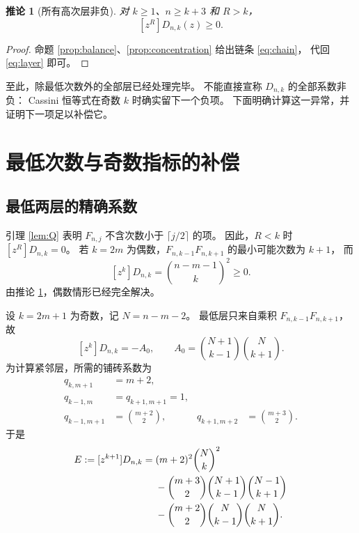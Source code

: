 \documentclass[UTF8,a4paper,11pt,fontset=none]{ctexart}
\numberwithin{equation}{section}
\theoremstyle{paperplain}
\newtheorem{corollary}[theorem]{推论}
\theoremstyle{definition}
\theoremstyle{remark}
\begin{document}
\begin{corollary}[所有高次层非负]\label{cor:high}
对 $k\ge1$、$n\ge k+3$ 和 $R>k$，
\begin{equation}\label{eq:high-positive}
[z^R]D_{n,k}(z)\ge0.
\end{equation}
\end{corollary}
\begin{proof}
命题 \ref{prop:balance}、\ref{prop:concentration} 给出链条 \eqref{eq:chain}，
代回 \eqref{eq:layer} 即可。
\end{proof}

至此，除最低次数外的全部层已经处理完毕。
不能直接宣称 $D_{n,k}$ 的全部系数非负：
Cassini 恒等式在奇数 $k$ 时确实留下一个负项。
下面明确计算这一异常，并证明下一项足以补偿它。

\section{最低次数与奇数指标的补偿}\label{sec:exception}
\subsection{最低两层的精确系数}
引理 \ref{lem:Q} 表明 $F_{n,j}$ 不含次数小于 $\lceil j/2\rceil$ 的项。
因此，$R<k$ 时 $[z^R]D_{n,k}=0$。
若 $k=2m$ 为偶数，$F_{n,k-1}F_{n,k+1}$ 的最小可能次数为 $k+1$，
而
\begin{equation}\label{eq:even-low}
[z^k]D_{n,k}=\binom{n-m-1}{k}^2\ge0.
\end{equation}
由推论 \ref{cor:high}，偶数情形已经完全解决。

设 $k=2m+1$ 为奇数，记 $N=n-m-2$。
最低层只来自乘积 $F_{n,k-1}F_{n,k+1}$，故
\begin{equation}\label{eq:odd-low}
[z^k]D_{n,k}=-A_0,\qquad
A_0=\binom{N+1}{k-1}\binom N{k+1}.
\end{equation}
为计算紧邻层，所需的铺砖系数为
\begin{align*}
q_{k,m+1}&=m+2,\\
q_{k-1,m}&=q_{k+1,m+1}=1,\\
q_{k-1,m+1}&=\binom{m+2}{2},&
q_{k+1,m+2}&=\binom{m+3}{2}.
\end{align*}
于是
\begin{align}
E:=[z^{k+1}]D_{n,k}
={}&(m+2)^2\binom Nk^2\notag\\
&-\binom{m+3}{2}\binom{N+1}{k-1}\binom{N-1}{k+1}\notag\\
&-\binom{m+2}{2}\binom N{k-1}\binom N{k+1}.\label{eq:E}
\end{align}
\end{document}
